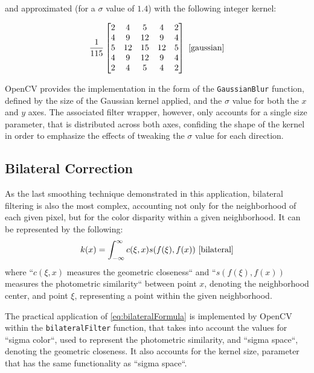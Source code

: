 and approximated (for a \(\sigma\) value of \(1.4\)) with the following integer kernel:

\begin{equation}
	\label{eq:gaussianKernel}
	{1\over115}
	\begin{bmatrix}
		2 & 4  & 5  & 4  & 2 \\
		4 & 9  & 12 & 9  & 4 \\
		5 & 12 & 15 & 12 & 5 \\
		4 & 9  & 12 & 9  & 4 \\
		2 & 4  & 5  & 4  & 2 \\
	\end{bmatrix}
	\text{ \cite{gaussian}}
\end{equation}

OpenCV provides the implementation in the form of the \verb|GaussianBlur| function, defined by the size of
the Gaussian kernel applied, and the \(\sigma\) value for both the \(x\) and \(y\) axes. The associated
filter wrapper, however, only accounts for a single size parameter, that is distributed across both axes,
confiding the shape of the kernel in order to emphasize the effects of tweaking the \(\sigma\) value for
each direction.

\subsection{Bilateral Correction}

As the last smoothing technique demonstrated in this application, bilateral filtering is also the most
complex, accounting not only for the neighborhood of each given pixel, but for the color disparity within
a given neighborhood. It can be represented by the following:
\begin{equation}
	\label{eq:bilateralFormula}
	k(x) = \int_{-\infty}^{\infty} c(\xi, x) s(f(\xi), f(x))
	\text{ \cite{bilateral}}
\end{equation}
where ``\(c(\xi, x)\) measures the geometric closeness`` and ``\(s(f(\xi), f(x))\) measures the photometric
similarity`` between point \(x\), denoting the neighborhood center, and point \(\xi\), representing a point
within the given neighborhood. \cite{bilateral}

The practical application of \cref{eq:bilateralFormula} is implemented by OpenCV within the
\verb|bilateralFilter| function, that takes into account the values for ``sigma color``, used to represent
the photometric similarity, and ``sigma space``, denoting the geometric closeness. It also accounts for the
kernel size, parameter that has the same functionality as ``sigma space``. \cite{opencvImproc}

